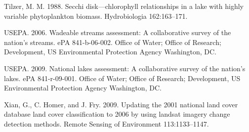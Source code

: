 \documentclass[12pt,]{article}
\begin{document}
Tilzer, M. M. 1988. Secchi disk---chlorophyll relationships in a lake
with highly variable phytoplankton biomass. Hydrobiologia 162:163--171.

USEPA. 2006. Wadeable streams assessment: A collaborative survey of the
nation's streams. ePA 841-b-06-002. Office of Water; Office of Research;
Development, US Environmental Protection Agency Washington, DC.

USEPA. 2009. National lakes assessment: A collaborative survey of the
nation's lakes. ePA 841-r-09-001. Office of Water; Office of Research;
Development, US Environmental Protection Agency Washington, DC.

Xian, G., C. Homer, and J. Fry. 2009. Updating the 2001 national land
cover database land cover classification to 2006 by using landsat
imagery change detection methods. Remote Sensing of Environment
113:1133--1147.
\end{document}
